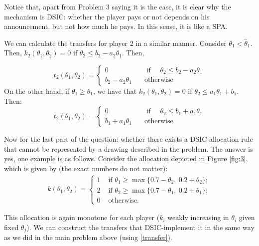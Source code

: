 \documentclass[a4paper]{article}
\begin{document}
	Notice that, apart from Problem 3 saying it is the case, it is clear why the mechanism is DSIC: whether the player pays or not depends on his announcement, but not how much he pays. In this sense, it is like a SPA.
	
	We can calculate the transfers for player 2 in a similar manner. Consider $\theta_1<\hat{\theta}_1$. Then, $k_2(\theta_1,\theta_2)=0$ if $\theta_2\leq b_2-a_2 \theta_1$. Then,
	
	\[t_2(\theta_1,\theta_2)=\left\{\begin{array}{cc} 0 & \quad\text{ if }\quad  \theta_2\leq b_2-a_2 \theta_1\\
		b_2-a_2 \theta_1 & \quad\text{otherwise}\quad
		
	\end{array}
	\right.
	\]
	On the other hand, if $\theta_1\geq\hat{\theta}_1$, we have that $k_2(\theta_1,\theta_2)=0$ if $\theta_2\leq a_1\theta_1+b_1$. Then:
	\[t_2(\theta_1,\theta_2)=\left\{\begin{array}{cc} 0 & \quad\text{ if }\quad  \theta_2\leq b_1+a_1 \theta_1\\
		b_1+a_1 \theta_1 & \quad\text{otherwise}\quad
		
	\end{array}
	\right.
	\]
	
	
	
	Now for the last part of the question: whether there exists a DSIC allocation rule that cannot be represented by a drawing described in the problem. The answer is yes, one example is as follows.
	Consider the allocation depicted in Figure \ref{fig:3}, which is given by (the exact numbers do not matter):
	\begin{align*}
		k(\theta_1,\theta_2) = \begin{cases}
			1 & \text{ if } \theta_1 \geq \max\{ 0.7 - \theta_2, \ 0.2 + \theta_2 \};
			\\
			2 & \text{ if } \theta_2 \geq \max\{ 0.7 - \theta_1, \ 0.2 + \theta_1 \};
			\\
			0 & \text{ otherwise.}
		\end{cases}
	\end{align*}
	
	This allocation is again monotone for each player ($k_i$ weakly increasing in $\theta_i$ given fixed $\theta_j$). We can construct the transfers that DSIC-implement it in the same way as we did in the main problem above (using \eqref{transfer}).
	
\end{document}
